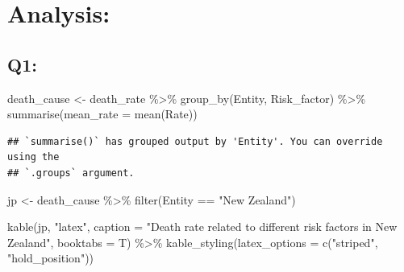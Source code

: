\documentclass[11pt,a4paper,]{article}
\newenvironment{Shaded}{\begin{snugshade}}{\end{snugshade}}
\newcommand{\AttributeTok}[1]{\textcolor[rgb]{0.77,0.63,0.00}{#1}}
\newcommand{\DecValTok}[1]{\textcolor[rgb]{0.00,0.00,0.81}{#1}}
\newcommand{\FunctionTok}[1]{\textcolor[rgb]{0.00,0.00,0.00}{#1}}
\newcommand{\NormalTok}[1]{#1}
\newcommand{\OtherTok}[1]{\textcolor[rgb]{0.56,0.35,0.01}{#1}}
\newcommand{\SpecialCharTok}[1]{\textcolor[rgb]{0.00,0.00,0.00}{#1}}
\newcommand{\StringTok}[1]{\textcolor[rgb]{0.31,0.60,0.02}{#1}}
\begin{document}
\hypertarget{analysis}{%
\section{Analysis:}\label{analysis}}

\hypertarget{q1}{%
\subsection{Q1:}\label{q1}}

\begin{Shaded}
\begin{Highlighting}[]
\NormalTok{death\_cause }\OtherTok{\textless{}{-}}\NormalTok{ death\_rate }\SpecialCharTok{\%\textgreater{}\%}
  \FunctionTok{group\_by}\NormalTok{(Entity, Risk\_factor) }\SpecialCharTok{\%\textgreater{}\%}
  \FunctionTok{summarise}\NormalTok{(}\AttributeTok{mean\_rate =} \FunctionTok{mean}\NormalTok{(Rate))}
\end{Highlighting}
\end{Shaded}

\begin{verbatim}
## `summarise()` has grouped output by 'Entity'. You can override using the
## `.groups` argument.
\end{verbatim}

\begin{Shaded}
\end{Shaded}

\begin{Shaded}
\begin{Highlighting}[]
\NormalTok{jp }\OtherTok{\textless{}{-}}\NormalTok{ death\_cause }\SpecialCharTok{\%\textgreater{}\%}
  \FunctionTok{filter}\NormalTok{(Entity }\SpecialCharTok{==} \StringTok{"New Zealand"}\NormalTok{)}

\FunctionTok{kable}\NormalTok{(jp, }\StringTok{"latex"}\NormalTok{, }\AttributeTok{caption =} \StringTok{"Death rate related to different risk factors in New Zealand"}\NormalTok{, }\AttributeTok{booktabs =}\NormalTok{ T) }\SpecialCharTok{\%\textgreater{}\%}
  \FunctionTok{kable\_styling}\NormalTok{(}\AttributeTok{latex\_options =} \FunctionTok{c}\NormalTok{(}\StringTok{"striped"}\NormalTok{, }\StringTok{"hold\_position"}\NormalTok{))}
\end{Highlighting}
\end{Shaded}
\end{document}
